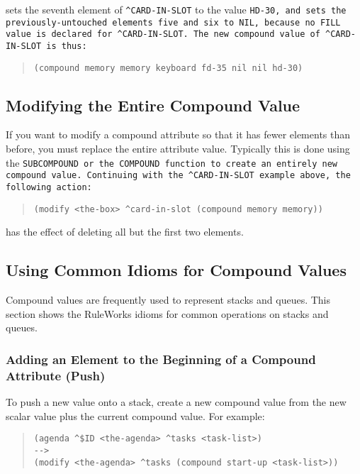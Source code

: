 sets the seventh element of \verb|^CARD-IN-SLOT| to the value \tt{HD-30},
and sets the previously-untouched elements five and six to \tt{NIL},
because no \tt{FILL} value is declared for \verb|^CARD-IN-SLOT|. The new
compound value of \verb|^CARD-IN-SLOT| is thus:
\begin{quote}
\begin{verbatim}
(compound memory memory keyboard fd-35 nil nil hd-30)
\end{verbatim}
\end{quote}

\subsection{Modifying the Entire Compound Value}

If you want to modify a compound attribute so that it has fewer
elements than before, you must replace the entire attribute value.
Typically this is done using the \tt{SUBCOMPOUND} or the \tt{COMPOUND}
function to create an entirely new compound value. Continuing with the
\verb|^CARD-IN-SLOT| example above, the following action:
\begin{quote}
\begin{verbatim}
(modify <the-box> ^card-in-slot (compound memory memory))
\end{verbatim}
\end{quote}
has the effect of deleting all but the first two elements.

\subsection{Using Common Idioms for Compound Values}

Compound values are frequently used to represent stacks and
queues. This section shows the RuleWorks idioms for common operations
on stacks and queues.

\subsubsection*{Adding an Element to the Beginning of a Compound
  Attribute (Push)}

To push a new value onto a stack, create a new compound value from the
new scalar value plus the current compound value. For example:
\begin{quote}
\begin{verbatim}
(agenda ^$ID <the-agenda> ^tasks <task-list>)
-->
(modify <the-agenda> ^tasks (compound start-up <task-list>))
\end{verbatim}
\end{quote}

